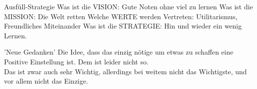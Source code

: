 \begin{frame}[c]{Ausfüll-Strategie}
    Was ist die VISION:
    \newline
    Gute Noten ohne viel zu lernen
    \newline
    \newline
    Was ist die MISSION:
    \newline
    Die Welt retten
    \newline
    \newline
    Welche WERTE werden Vertreten:
    \newline
    Utilitarismus, Freundliches Miteinander
    \newline
    \newline
    Was ist die STRATEGIE:
    \newline
    Hin und wieder ein wenig Lernen.
    \newline
\end{frame}
\fi


\begin{frame}[c]{'Neue Gedanken'}
    \LARGE
    Die Idee, dass das einzig nötige um etwas zu schaffen eine Positive Einstellung ist.
    \pause
    \newline
    \newline
    Dem ist leider nicht so. \\
    \ifonline
    Das ist zwar auch sehr Wichtig, allerdings bei weitem nicht das Wichtigste, und vor allem nicht das Einzige.
    \fi
\end{frame}



